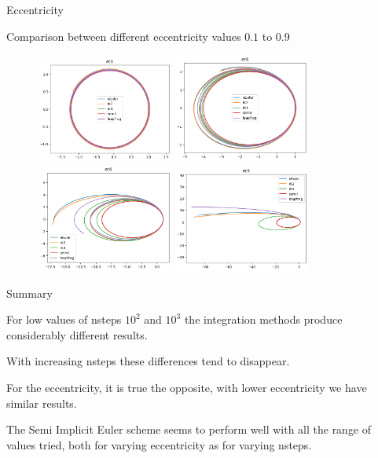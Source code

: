 \documentclass{beamer}
\begin{document}
\begin{frame}{Eccentricity}

	Comparison between different eccentricity values $0.1$ to $0.9$

\begin{figure}
\centering
    \includegraphics[width=0.4\textwidth]{../plots/ec1_plot.png}
    \includegraphics[width=0.4\textwidth]{../plots/ec6_plot.png}
    \includegraphics[width=0.4\textwidth]{../plots/ec8_plot.png}
    \includegraphics[width=0.4\textwidth]{../plots/ec9_plot.png}
    \label{fig:question}
\end{figure}
\end{frame}
\begin{frame}{Summary}

For low values of nsteps $10^2$ and $10^3$ the integration methods produce considerably different results. \bigskip

With increasing nsteps these differences tend to disappear. \bigskip

For the eccentricity, it is true the opposite, with lower eccentricity we have similar results.\bigskip

The Semi Implicit Euler scheme seems to perform well with all the range of values tried, both for varying eccentricity as for varying nsteps.

\end{frame}
\end{document}
